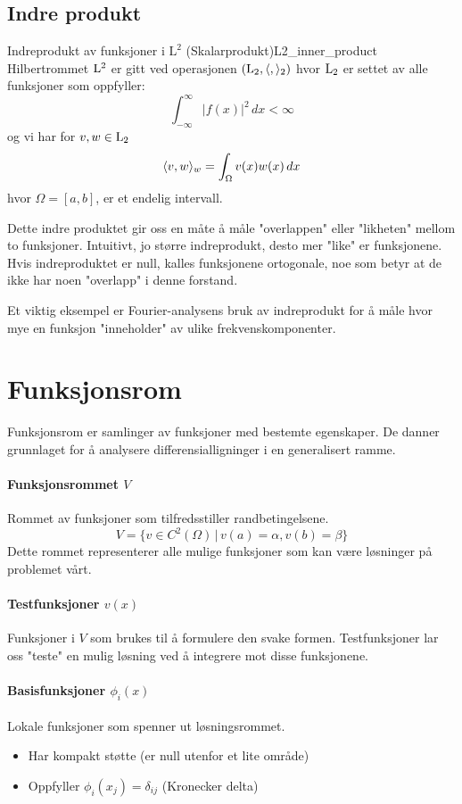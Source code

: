 \subsection{Indre produkt}
\begin{definition}{Indreprodukt av funksjoner i $\mathrm{L}^2$ (Skalarprodukt)}{L2_inner_product}
	Hilbertrommet $\mathrm{L}^2$ er gitt ved operasjonen $(\mathrm{L}_2, \langle,\rangle_{2})$ hvor $\mathrm{L}_2$ er settet av alle funksjoner som oppfyller:
	\[
		\int_{-\infty}^{\infty} |f(x)|^2 \,dx < \infty
	\]
	og vi har for $v, w\in \mathrm{L}_2$
	\[
		\langle v,w\rangle_w = \int_\Omega v(x)w(x) \,dx
	\]
	hvor $\Omega = [a, b]$, er et endelig intervall.
\end{definition}

Dette indre produktet gir oss en måte å måle "overlappen" eller "likheten" mellom to funksjoner. Intuitivt, jo større indreprodukt, desto mer "like" er funksjonene. Hvis indreproduktet er null, kalles funksjonene ortogonale, noe som betyr at de ikke har noen "overlapp" i denne forstand.

Et viktig eksempel er Fourier-analysens bruk av indreprodukt for å måle hvor mye en funksjon "inneholder" av ulike frekvenskomponenter.

\section{Funksjonsrom}
Funksjonsrom er samlinger av funksjoner med bestemte egenskaper. De danner grunnlaget for å analysere differensialligninger i en generalisert ramme.

\paragraph{Funksjonsrommet \(V\)} Rommet av funksjoner som tilfredsstiller randbetingelsene.
\[ V = \{ v \in C^2(\Omega) \, | \, v(a) = \alpha, v(b) = \beta \} \]
Dette rommet representerer alle mulige funksjoner som kan være løsninger på problemet vårt.

\paragraph{Testfunksjoner \(v(x)\)} Funksjoner i \(V\) som brukes til å formulere den svake formen.
Testfunksjoner lar oss "teste" en mulig løsning ved å integrere mot disse funksjonene.

\paragraph{Basisfunksjoner \(\phi_i(x)\)} Lokale funksjoner som spenner ut løsningsrommet.
\begin{itemize}
	\item Har kompakt støtte (er null utenfor et lite område)
	\item Oppfyller \(\phi_i(x_j) = \delta_{ij}\) (Kronecker delta)
\end{itemize}

